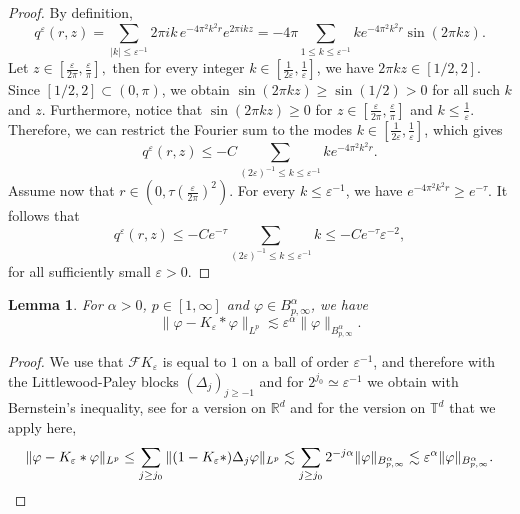 \documentclass[a4paper,12pt]{article}
\newtheorem{lemma}[theorem]{Lemma}
\newcommand{\R}{\mathbb{R}}
\newcommand{\T}{\mathbb{T}}
\begin{document}
\begin{proof}
 By definition,
\[
q^\varepsilon(r,z) 
= 
\sum_{|k|\leq \varepsilon^{-1}}
2\pi i k\, e^{-4\pi^2 k^2 r}e^{2\pi i kz} =-4\pi
\sum_{1\leq k\leq \varepsilon^{-1}}
k e^{-4\pi^2 k^2 r}\sin(2\pi k z).
\]  
Let
$ 
z\in \left[\frac{\varepsilon}{2\pi},\frac{\varepsilon}{\pi}\right],
$ 
then for every integer $k \in \left[
\frac{1}{2\varepsilon}, \frac{1}{\varepsilon}\right]$,
we have $2\pi k z\in [1/2,2]$. Since $[1/2,2]\subset(0,\pi)$,  we obtain $\sin(2\pi k z)\geq \sin(1/2)>0$
for all such $k$ and $z$. Furthermore, notice that $\sin(2\pi k z)\geq 0 $ for $z \in [\tfrac{\varepsilon}{2\pi},\tfrac{\varepsilon}{\pi}]$ and $k \leq \frac{1}{\varepsilon}$. Therefore, we can restrict the Fourier sum to the modes $k \in [
\tfrac{1}{2\varepsilon}, \tfrac{1}{\varepsilon}]$, which gives
\[
q^\varepsilon(r,z)
\leq
-C
\sum_{(2\varepsilon)^{-1}\leq k\leq \varepsilon^{-1}}
k e^{-4\pi^2 k^2r}.
\]
Assume now that
$r\in (0, \tau (\tfrac{\varepsilon}{2\pi})^2)$.
For every $k\leq\varepsilon^{-1}$, we have $e^{-4\pi^2 k^2r}
\geq e^{-\tau}$. It follows that
\[
q^\varepsilon(r,z)
\leq
-Ce^{-\tau}
\sum_{(2\varepsilon)^{-1}\leq k\leq \varepsilon^{-1}} k \leq -Ce^{-\tau}\varepsilon^{-2},
\]
for all sufficiently small \(\varepsilon>0\).
\end{proof}


\begin{lemma}\label{lem:K-eps-error}
    For $\alpha>0$, $p\in[1,\infty]$ and $\varphi \in B^\alpha_{p,\infty}$, we have
    \[
        \|\varphi - K_\varepsilon\ast \varphi\|_{L^p} \lesssim \varepsilon^\alpha \|\varphi\|_{B^\alpha_{p,\infty}}.
    \]
\end{lemma}

\begin{proof} We use that $\mathcal{F} K_{\varepsilon}$ is equal to $1$ on a
  ball of order $\varepsilon^{- 1}$, and therefore with the Littlewood-Paley blocks $(\Delta_j)_{j \geq-1}$ and for $2^{j_0} \simeq
  \varepsilon^{-1}$ we obtain with Bernstein's inequality, see \cite[Lemma 2.1]{Bahouri2011} for a version on $\R^d$ and \cite[Lemma~7]{Gubinelli2015EBP} for the version on $\T^d$ that we apply here,
  \[ \| \varphi - K_{\varepsilon} \ast \varphi
     \|_{L^p} \leq \sum_{j \geq j_0} \| (1 -
     K_{\varepsilon}\ast) \Delta_j \varphi \|_{L^p} \lesssim
     \sum_{j \geq j_0} 2^{-j \alpha} \| \varphi \|_{B^{\alpha}_{p,\infty}} \lesssim \varepsilon^{\alpha} \| \varphi
     \|_{B^{\alpha}_{p,\infty}}. \qedhere
  \]
\end{proof}
\end{document}
